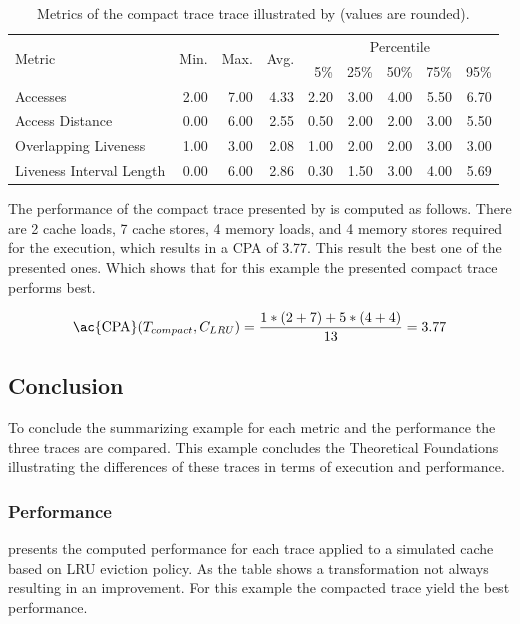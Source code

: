 \documentclass[onecolumn, openright, master, english, signatures]{dbrgrptt}
\begin{document}
\begin{table}[!ht]
  \centering
  \begin{tabular}{lrrrrrrrr}
    \hline
    \multirow{2}{*}{Metric} & \multirow{2}{*}{Min.} & \multirow{2}{*}{Max.} & \multirow{2}{*}{Avg.} & \multicolumn{5}{c}{Percentile} \tabularnewline
    & & & & 5\% & 25\% & 50\% & 75\% & 95\% \tabularnewline
    \hline
    Accesses                 & 2.00 & 7.00 & 4.33 & 2.20 & 3.00 & 4.00 & 5.50 & 6.70 \\
    Access Distance          & 0.00 & 6.00 & 2.55 & 0.50 & 2.00 & 2.00 & 3.00 & 5.50 \\
    Overlapping Liveness     & 1.00 & 3.00 & 2.08 & 1.00 & 2.00 & 2.00 & 3.00 & 3.00 \\
    Liveness Interval Length & 0.00 & 6.00 & 2.86 & 0.30 & 1.50 & 3.00 & 4.00 & 5.69 \\
    \hline
  \end{tabular}
  \caption{Metrics of the compact trace \ac{trace} illustrated by  (values are rounded).}
  \label{tab:summarizing-example-metrics-compact}
\end{table}

The performance of the compact trace presented by  is computed as follows. There are 2 cache loads, 7 cache stores, 4 memory loads, and 4 memory stores required for the execution, which results in a \ac{CPA} of 3.77. This result the best one of the presented ones. Which shows that for this example the presented compact trace performs best.

\begin{equation}\label{equ:trace-transformation-compact-marked}
\text{\ac{CPA}}(T_{compact}, C_{LRU}) = \frac{1 * (2 + 7) + 5 * (4 + 4)}{13} = 3.77
\end{equation}

\subsection{Conclusion}
To conclude the summarizing example for each metric and the performance the three \ac{trace}s are compared. This example concludes the Theoretical Foundations illustrating the differences of these \ac{trace}s in terms of execution and performance.

\subsubsection{Performance}
 presents the computed performance for each \ac{trace} applied to a simulated cache based on \ac{LRU} eviction policy. As the table shows a transformation not always resulting in an improvement. For this example the compacted \ac{trace} yield the best performance.
\end{document}
